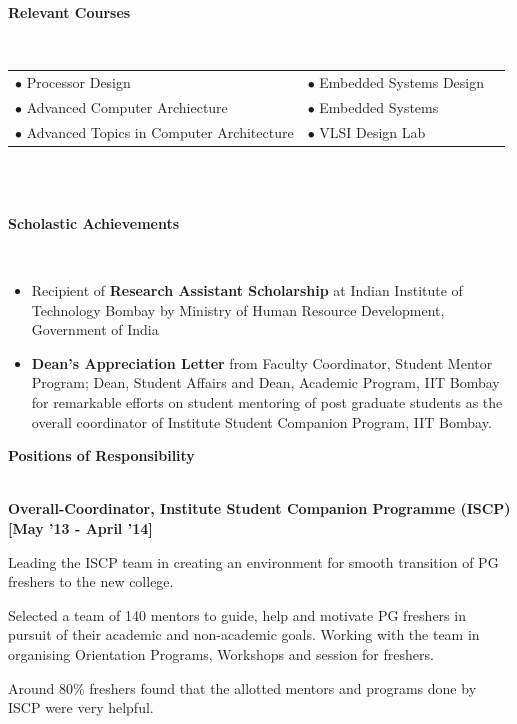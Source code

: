 \documentclass[a4paper,10pt]{article}
\begin{document}
\colorbox{titleColor}{\parbox{6.7in}{\textbf{Relevant Courses}}}\\[0.08in]
\begin{tabular}{p{3.5in}p{3in}p{2.5in}}
  \hspace{0.9pc}$\bullet$ Processor Design                         & $\bullet$ Embedded Systems Design \\[0.05in]
  \hspace{0.9pc}$\bullet$ Advanced Computer Archiecture            & $\bullet$ Embedded Systems        \\[0.05in]
  \hspace{0.9pc}$\bullet$ Advanced Topics in Computer Architecture & $\bullet$ VLSI Design Lab         \\[0.05in]
\end{tabular}
\\\\
\colorbox{titleColor}{\parbox{6.7in}{\textbf{Scholastic Achievements}}}\\
\begin{itemize}
  \setlength{\itemsep}{1pt}
  \item Recipient of \textbf{Research Assistant Scholarship} at Indian Institute of Technology Bombay by Ministry of Human
        Resource Development, Government of India
  \item \textbf{Dean's Appreciation Letter} from Faculty Coordinator, Student Mentor Program; Dean, Student Affairs and Dean,
        Academic Program, IIT Bombay for remarkable efforts on student mentoring of post graduate students as the overall coordinator of Institute Student Companion Program, IIT Bombay.
\end{itemize}

\colorbox{titleColor}{\parbox{6.7in}{\textbf{Positions of Responsibility}}}\\

\textbf{Overall-Coordinator, Institute Student Companion Programme (ISCP)}  \hfill {\small{{\textbf{[May '13 - April '14]}}}\/}
\begin{itemize*}
  \item Leading the ISCP team in creating an environment for smooth transition of PG freshers to the new college.
  \item Selected a team of 140 mentors to guide, help and motivate PG freshers in pursuit of their academic and non-academic goals. Working with the team in organising Orientation Programs, Workshops and session for freshers.
  \item Around 80\% freshers found that the allotted mentors and programs done by ISCP were very helpful.

\end{itemize*}
\end{document}
